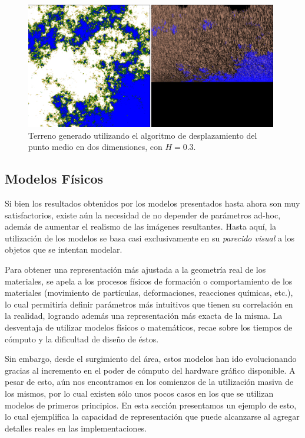\begin{figure}
\center
\includegraphics[width=11cm]{figures/terreno2}
\caption[Terreno generado utilizando el algoritmo de desplazamiento del punto medio en dos dimensiones, con $H = 0.3$]{Terreno generado utilizando el algoritmo de desplazamiento del punto medio en dos dimensiones, con $H = 0.3$.}
\label{fg:terreno2}
\end{figure}



\subsection{Modelos Físicos}
Si bien los resultados obtenidos por los modelos presentados hasta ahora son muy satisfactorios, existe aún la necesidad de no depender de parámetros ad-hoc, además de aumentar el realismo de las imágenes resultantes.
Hasta aquí, la utilización de los modelos se basa casi exclusivamente en su {\em parecido visual} a los objetos que se intentan modelar.

Para obtener una representación más ajustada a la geometría real de los materiales, se apela a los procesos físicos de formación o comportamiento de los materiales (movimiento de partículas, deformaciones, reacciones químicas, etc.), lo cual permitiría definir parámetros más intuitivos que tienen su correlación en la realidad, logrando además una representación más exacta de la misma.
La desventaja de utilizar modelos físicos o matemáticos, recae sobre los tiempos de cómputo y la dificultad de diseño de éstos.

Sin embargo, desde el surgimiento del área, estos modelos han ido evolucionando gracias al incremento en el poder de cómputo del hardware gráfico disponible. A pesar de esto, aún nos encontramos en los comienzos de la utilización masiva de los mismos, por lo cual existen sólo unos pocos casos en los que se utilizan modelos de primeros principios.
En esta sección presentamos un ejemplo de esto, lo cual ejemplifica la capacidad de representación que puede alcanzarse al agregar detalles reales en las implementaciones.

